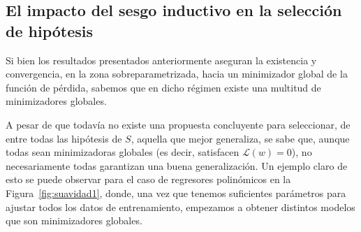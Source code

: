 \subsection{El impacto del sesgo inductivo en la selección de hipótesis}\label{subsec:suavidad-funcional}

Si bien los resultados presentados anteriormente aseguran la existencia y convergencia, en la zona sobreparametrizada, hacia un minimizador global de la función de pérdida, sabemos que en dicho régimen existe una multitud de minimizadores globales.  

A pesar de que todavía no existe una propuesta concluyente para seleccionar, de entre todas las hipótesis de $S$, aquella que mejor generaliza, se sabe que, aunque todas sean minimizadoras globales (es decir, satisfacen $\mathcal{L}(w) = 0$), no necesariamente todas garantizan una buena generalización. Un ejemplo claro de esto se puede observar para el caso de regresores polinómicos en la Figura~\ref{fig:suavidad1}, donde, una vez que tenemos suficientes parámetros para ajustar todos los datos de entrenamiento, empezamos a obtener distintos modelos que son minimizadores globales.

